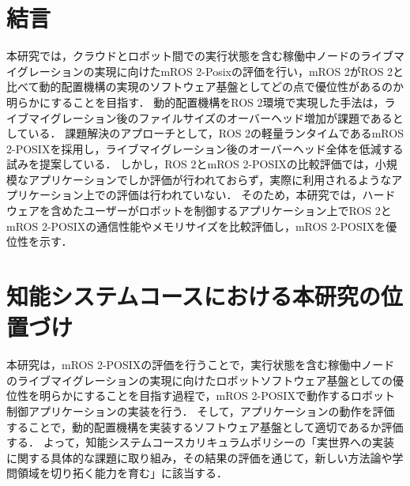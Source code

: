 \documentclass[11pt]{ujarticle}
\begin{document}
\section{結言}
本研究では，クラウドとロボット間での実行状態を含む稼働中ノードのライブマイグレーションの実現に向けたmROS 2-Posixの評価を行い，mROS 2がROS 2と比べて動的配置機構の実現のソフトウェア基盤としてどの点で優位性があるのか明らかにすることを目指す．
動的配置機構をROS 2環境で実現した手法は，ライブマイグレーション後のファイルサイズのオーバーヘッド増加が課題であるとしている．
課題解決のアプローチとして，ROS 2の軽量ランタイムであるmROS 2-POSIXを採用し，ライブマイグレーション後のオーバーヘッド全体を低減する試みを提案している．
しかし，ROS 2とmROS 2-POSIXの比較評価では，小規模なアプリケーションでしか評価が行われておらず，実際に利用されるようなアプリケーション上での評価は行われていない．
そのため，本研究では，ハードウェアを含めたユーザーがロボットを制御するアプリケーション上でROS 2とmROS 2-POSIXの通信性能やメモリサイズを比較評価し，mROS 2-POSIXを優位性を示す．

\section{知能システムコースにおける本研究の位置づけ}
本研究は，mROS 2-POSIXの評価を行うことで，実行状態を含む稼働中ノードのライブマイグレーションの実現に向けたロボットソフトウェア基盤としての優位性を明らかにすることを目指す過程で，mROS 2-POSIXで動作するロボット制御アプリケーションの実装を行う．
そして，アプリケーションの動作を評価することで，動的配置機構を実装するソフトウェア基盤として適切であるか評価する．
よって，知能システムコースカリキュラムポリシーの「実世界への実装に関する具体的な課題に取り組み，その結果の評価を通じて，新しい方法論や学問領域を切り拓く能力を育む」に該当する．
\end{document}
